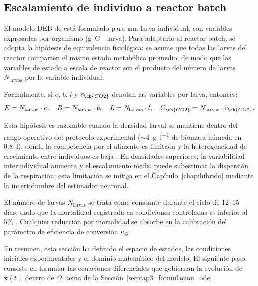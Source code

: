 \subsection{Escalamiento de individuo a reactor batch}
\label{subsec:cap3_escalamiento}

El modelo DEB de \textcite{eriksenDynamicModellingFeed2022} está formulado para una larva individual, con variables expresadas por organismo (\si{\gram C \per larva}). Para adaptarlo al reactor batch, se adopta la hipótesis de equivalencia fisiológica: se asume que todas las larvas del reactor comparten el mismo estado metabólico promedio, de modo que las variables de estado a escala de reactor son el producto del número de larvas $N_{\mathrm{larvas}}$ por la variable individual.

Formalmente, si $\tilde{e}$, $\tilde{b}$, $\tilde{l}$ y $\tilde{c}_{\ch{CO2}}$ denotan las variables por larva, entonces:
\begin{equation}
    E = N_{\mathrm{larvas}} \cdot \tilde{e}, \quad
    B = N_{\mathrm{larvas}} \cdot \tilde{b}, \quad
    L = N_{\mathrm{larvas}} \cdot \tilde{l}, \quad
    C_{\ch{CO2}} = N_{\mathrm{larvas}} \cdot \tilde{c}_{\ch{CO2}}.
    \label{eq:cap3_escalamiento}
\end{equation}

Esta hipótesis es razonable cuando la densidad larval se mantiene dentro del rango operativo del protocolo experimental ($\sim$\SI{4}{\gram\per\litre} de biomasa húmeda en \SI{0,8}{\litre}), donde la competencia por el alimento es limitada y la heterogeneidad de crecimiento entre individuos es baja \parencite{dienerConversionOrganicMaterial2011,guillaumeAsymptoticEstimatedDigestibility2023}. En densidades superiores, la variabilidad interindividual aumenta y el escalamiento medio puede subestimar la dispersión de la respiración; esta limitación se mitiga en el Capítulo~\ref{chap:hibrido} mediante la incertidumbre del estimador neuronal.

El número de larvas $N_{\mathrm{larvas}}$ se trata como constante durante el ciclo de 12--15 días, dado que la mortalidad registrada en condiciones controladas es inferior al $5\%$ \parencite{salamEffectDifferentEnvironmental2022}. Cualquier reducción por mortalidad se absorbe en la calibración del parámetro de eficiencia de conversión $\kappa_G$.

En resumen, esta sección ha definido el espacio de estados, las condiciones iniciales experimentales y el dominio matemático del modelo. El siguiente paso consiste en formular las ecuaciones diferenciales que gobiernan la evolución de $\mathbf{x}(t)$ dentro de $\Omega$, tema de la Sección~\ref{sec:cap3_formulacion_ode}.